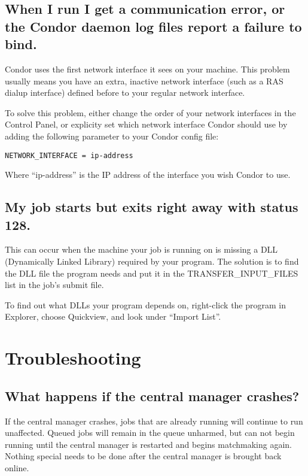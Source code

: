 \subsection{When I run  I get a communication error, or the
Condor daemon log files report a failure to bind.}

Condor uses the first network interface it sees on your machine.
This problem usually means you have an extra, inactive network
interface (such as a RAS dialup interface) defined before to your
regular network interface.

To solve this problem, either change the order of your network
interfaces in the Control Panel, or explicity set which network
interface Condor should use by adding the following parameter to your
Condor config file:

\begin{verbatim}NETWORK_INTERFACE = ip-address\end{verbatim}

Where ``ip-address'' is the IP address of the interface you wish
Condor to use.

\subsection{My job starts but exits right away with status 128.}

This can occur when the machine your job is running on is missing a
DLL (Dynamically Linked Library) required by your program.
The solution is to find the DLL file the program needs and put it in
the TRANSFER\_INPUT\_FILES list in the job's submit file.

To find out what DLLs your program depends on, right-click the program
in Explorer, choose Quickview, and look under ``Import List''.


\section{Troubleshooting}

\subsection{What happens if the central manager crashes?} 

If the central manager crashes, jobs that are already running will
continue to run unaffected.
Queued jobs will remain in the queue unharmed, but can not begin
running until the central manager is restarted and begins matchmaking
again.
Nothing special needs to be done after the central manager is brought
back online.

